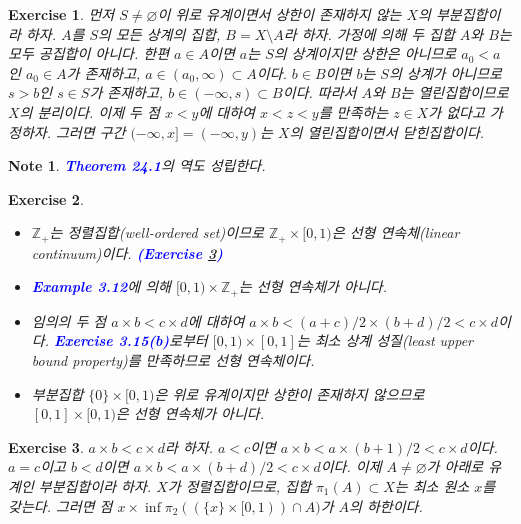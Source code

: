 \documentclass{article}
\newtheorem{exercise}{Exercise}[section]
\newtheorem*{note}{Note}
\newcommand{\Z}{\mathbb{Z}}
\begin{document}
\begin{exercise}
    먼저 $S\ne\varnothing$이 위로 유계이면서 상한이 존재하지 않는 $X$의 부분집합이라 하자. $A$를 $S$의 모든 상계의 집합, $B=X\setminus A$라 하자. 가정에 의해 두 집합 $A$와 $B$는 모두 공집합이 아니다. 한편 $a\in A$이면 $a$는 $S$의 상계이지만 상한은 아니므로 $a_0<a$인 $a_0\in A$가 존재하고, $a\in(a_0,\infty)\subset A$이다. $b\in B$이면 $b$는 $S$의 상계가 아니므로 $s>b$인 $s\in S$가 존재하고, $b\in(-\infty,s)\subset B$이다. 따라서 $A$와 $B$는 열린집합이므로 $X$의 분리이다. 이제 두 점 $x<y$에 대하여 $x<z<y$를 만족하는 $z\in X$가 없다고 가정하자. 그러면 구간 $(-\infty,x]=(-\infty,y)$는 $X$의 열린집합이면서 닫힌집합이다.
\end{exercise}
\begin{note}
    \textcolor{blue}{\textbf{Theorem 24.1}}의 역도 성립한다.
\end{note}

\begin{exercise}
    \phantom{}
    \begin{itemize}
        \item[(a)] $\Z_+$는 정렬집합(well-ordered set)이므로 $\Z_+\times[0,1)$은 선형 연속체(linear continuum)이다. \textcolor{blue}{\textbf{(Exercise \ref{exc:24.6})}}
        \item[(b)] \textcolor{blue}{\textbf{Example 3.12}}에 의해 $[0,1)\times\Z_+$는 선형 연속체가 아니다.
        \item[(c)] 임의의 두 점 $a\times b<c\times d$에 대하여 $a\times b<(a+c)/2\times(b+d)/2<c\times d$이다. \textcolor{blue}{\textbf{Exercise 3.15(b)}}로부터 $[0,1)\times[0,1]$는 최소 상계 성질(least upper bound property)를 만족하므로 선형 연속체이다.
        \item[(d)] 부분집합 $\{0\}\times[0,1)$은 위로 유계이지만 상한이 존재하지 않으므로 $[0,1]\times[0,1)$은 선형 연속체가 아니다.
    \end{itemize}
\end{exercise}

\begin{exercise}
	\label{exc:24.6}
    $a\times b<c\times d$라 하자. $a<c$이면 $a\times b<a\times(b+1)/2<c\times d$이다. $a=c$이고 $b<d$이면 $a\times b<a\times(b+d)/2<c\times d$이다. 이제 $A\ne\varnothing$가 아래로 유계인 부분집합이라 하자. $X$가 정렬집합이므로, 집합 $\pi_1(A)\subset X$는 최소 원소 $x$를 갖는다. 그러면 점 $x\times\inf\pi_2((\{x\}\times[0,1))\cap A)$가 $A$의 하한이다.
\end{exercise}
\end{document}
